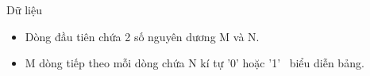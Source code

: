 Dữ liệu  
\begin{itemize}
	\item     Dòng đầu tiên chứa 2 số nguyên dương M và N.   
	\item     M dòng tiếp theo mỗi dòng chứa N kí tự '0' hoặc '1'  biểu diễn bảng.   
\end{itemize}
